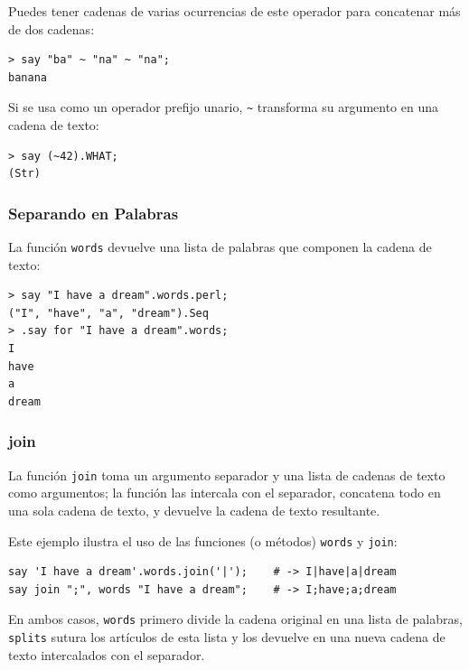 Puedes tener cadenas de varias ocurrencias de este operador
para concatenar más de dos cadenas:

\begin{verbatim}
> say "ba" ~ "na" ~ "na";
banana
\end{verbatim}
%

Si se usa como un operador prefijo unario,
\verb|~| transforma su argumento en una cadena de texto:

\begin{verbatim}
> say (~42).WHAT;
(Str)
\end{verbatim}
%

\subsubsection{Separando en Palabras}

La función {\tt words} devuelve una lista de palabras
que componen la cadena de texto:

\begin{verbatim}
> say "I have a dream".words.perl;
("I", "have", "a", "dream").Seq
> .say for "I have a dream".words;
I
have
a
dream
\end{verbatim}
%

\subsubsection{join}

La función {\tt join} toma un argumento separador y una lista
de cadenas de texto como argumentos; la función las intercala
con el separador, concatena todo en una sola cadena de texto, y 
devuelve la cadena de texto resultante.

Este ejemplo ilustra el uso de las funciones (o métodos) 
{\tt words} y {\tt join}:

\begin{verbatim}
say 'I have a dream'.words.join('|');    # -> I|have|a|dream
say join ";", words "I have a dream";    # -> I;have;a;dream
\end{verbatim}
%

En ambos casos, {\tt words} primero divide la cadena original
en una lista de palabras,  {\tt splits} sutura los artículos
de esta lista y los devuelve en una nueva cadena de texto 
intercalados con el separador.

